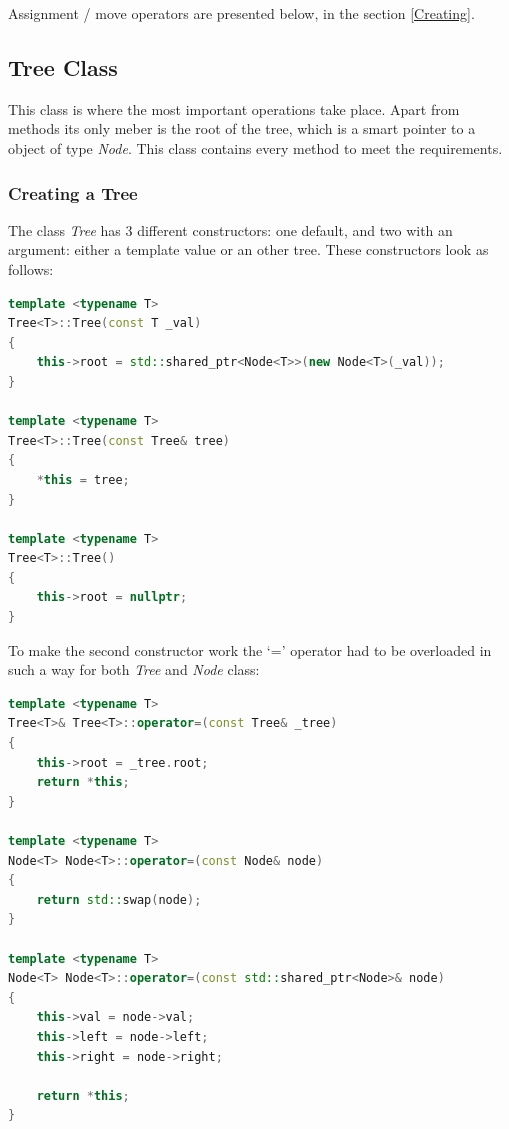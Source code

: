 \documentclass[12pt]{article}
\begin{document}
Assignment / move operators are presented below, in the section \ref{Creating}.

\subsection{Tree Class}
This class is where the most important operations take place. Apart from methods its only meber is the root of the tree, which is a smart pointer to a object of type \textit{Node}. This class contains every method to meet the requirements.

\pagebreak
\subsubsection{Creating a Tree\label{Creating}}
The class \textit{Tree} has 3 different constructors: one default, and two with an argument: either a template value or an other tree. These constructors look as follows:
\begin{footnotesize}
\begin{lstlisting}[language=C++]
template <typename T>
Tree<T>::Tree(const T _val)
{
    this->root = std::shared_ptr<Node<T>>(new Node<T>(_val));
}

template <typename T>
Tree<T>::Tree(const Tree& tree)
{
    *this = tree;
}

template <typename T>
Tree<T>::Tree()
{
    this->root = nullptr;
}
\end{lstlisting}
\end{footnotesize}

\pagebreak
To make the second constructor work the `=' operator had to be overloaded in such a way for both \textit{Tree} and \textit{Node} class:
\begin{footnotesize}
\begin{lstlisting}[language=C++]
template <typename T>
Tree<T>& Tree<T>::operator=(const Tree& _tree) 
{
    this->root = _tree.root;
    return *this;
}

template <typename T>
Node<T> Node<T>::operator=(const Node& node)
{
    return std::swap(node);
}

template <typename T>
Node<T> Node<T>::operator=(const std::shared_ptr<Node>& node)
{
    this->val = node->val;
    this->left = node->left;
    this->right = node->right;

    return *this;
}
\end{lstlisting}
\end{footnotesize}

\pagebreak
\end{document}
